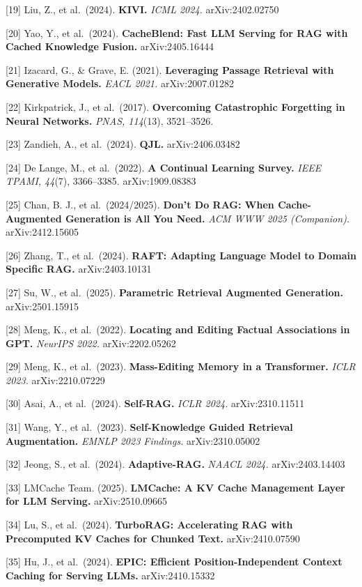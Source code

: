 {[}19{]} Liu, Z., et al.~(2024). \textbf{KIVI.} \emph{ICML 2024.} arXiv:2402.02750

{[}20{]} Yao, Y., et al.~(2024). \textbf{CacheBlend: Fast LLM Serving for RAG with Cached Knowledge Fusion.} arXiv:2405.16444

{[}21{]} Izacard, G., \& Grave, E. (2021). \textbf{Leveraging Passage Retrieval with Generative Models.} \emph{EACL 2021.} arXiv:2007.01282

{[}22{]} Kirkpatrick, J., et al.~(2017). \textbf{Overcoming Catastrophic Forgetting in Neural Networks.} \emph{PNAS, 114}(13), 3521--3526.

{[}23{]} Zandieh, A., et al.~(2024). \textbf{QJL.} arXiv:2406.03482

{[}24{]} De Lange, M., et al.~(2022). \textbf{A Continual Learning Survey.} \emph{IEEE TPAMI, 44}(7), 3366--3385. arXiv:1909.08383

{[}25{]} Chan, B. J., et al.~(2024/2025). \textbf{Don't Do RAG: When Cache-Augmented Generation is All You Need.} \emph{ACM WWW 2025 (Companion).} arXiv:2412.15605

{[}26{]} Zhang, T., et al.~(2024). \textbf{RAFT: Adapting Language Model to Domain Specific RAG.} arXiv:2403.10131

{[}27{]} Su, W., et al.~(2025). \textbf{Parametric Retrieval Augmented Generation.} arXiv:2501.15915

{[}28{]} Meng, K., et al.~(2022). \textbf{Locating and Editing Factual Associations in GPT.} \emph{NeurIPS 2022.} arXiv:2202.05262

{[}29{]} Meng, K., et al.~(2023). \textbf{Mass-Editing Memory in a Transformer.} \emph{ICLR 2023.} arXiv:2210.07229

{[}30{]} Asai, A., et al.~(2024). \textbf{Self-RAG.} \emph{ICLR 2024.} arXiv:2310.11511

{[}31{]} Wang, Y., et al.~(2023). \textbf{Self-Knowledge Guided Retrieval Augmentation.} \emph{EMNLP 2023 Findings.} arXiv:2310.05002

{[}32{]} Jeong, S., et al.~(2024). \textbf{Adaptive-RAG.} \emph{NAACL 2024.} arXiv:2403.14403

{[}33{]} LMCache Team. (2025). \textbf{LMCache: A KV Cache Management Layer for LLM Serving.} arXiv:2510.09665

{[}34{]} Lu, S., et al.~(2024). \textbf{TurboRAG: Accelerating RAG with Precomputed KV Caches for Chunked Text.} arXiv:2410.07590

{[}35{]} Hu, J., et al.~(2024). \textbf{EPIC: Efficient Position-Independent Context Caching for Serving LLMs.} arXiv:2410.15332

